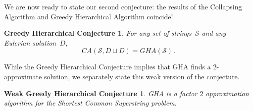 We are now ready to state our second conjecture: the results of the Collapsing Algorithm and Greedy Hierarchical Algorithm coincide!
\newtheorem*{ghcc}{Greedy Hierarchical Conjecture}
\begin{ghcc}
For any set of strings~$\mathcal{S}$ and any Eulerian solution~$D$,
\[CA(\mathcal{S}, D \sqcup D) = GHA(\mathcal{S}) \, .\]
\end{ghcc}
While the Greedy Hierarchical Conjecture implies that GHA finds a $2$-approximate solution, we separately state this weak version of the conjecture.

\newtheorem*{wghcc}{Weak Greedy Hierarchical Conjecture}
\begin{wghcc}
GHA is a factor $2$ approximation algorithm for the Shortest Common Superstring problem.
\end{wghcc}